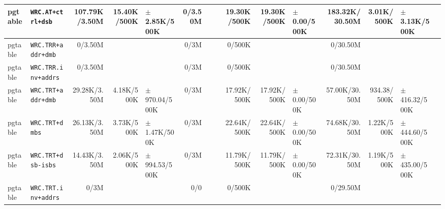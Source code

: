 \begin{tabular}{l l  | r r l | r r l | r r l | r r l l}
         pgtable &                                     \verb|WRC.AT+ctrl+dsb| &  107.79K/3.50M &           15.40K/500K &  $\pm$ 2.85K/500K &        0/3.50M &                       &                 &    19.30K/500K &           19.30K/500K &   $\pm$ 0.00/500K & 183.32K/30.50M &            3.01K/500K &  $\pm$ 3.13K/500K & \\ \hline 
         pgtable &                                    \verb|WRC.TRR+addr+dmb| &        0/3.50M &                       &                   &           0/3M &                       &                 &         0/500K &                       &                   &       0/30.50M &                       &                   & \\ \hline 
         pgtable &                                   \verb|WRC.TRR.inv+addrs| &        0/3.50M &                       &                   &           0/3M &                       &                 &         0/500K &                       &                   &       0/30.50M &                       &                   & \\ \hline 
         pgtable &                                    \verb|WRC.TRT+addr+dmb| &   29.28K/3.50M &            4.18K/500K & $\pm$ 970.04/500K &           0/3M &                       &                 &    17.92K/500K &           17.92K/500K &   $\pm$ 0.00/500K &  57.00K/30.50M &           934.38/500K & $\pm$ 416.32/500K & \\ \hline 
         pgtable &                                        \verb|WRC.TRT+dmbs| &   26.13K/3.50M &            3.73K/500K &  $\pm$ 1.47K/500K &           0/3M &                       &                 &    22.64K/500K &           22.64K/500K &   $\pm$ 0.00/500K &  74.68K/30.50M &            1.22K/500K & $\pm$ 444.60/500K & \\ \hline 
         pgtable &                                    \verb|WRC.TRT+dsb-isbs| &   14.43K/3.50M &            2.06K/500K & $\pm$ 994.53/500K &           0/3M &                       &                 &    11.79K/500K &           11.79K/500K &   $\pm$ 0.00/500K &  72.31K/30.50M &            1.19K/500K & $\pm$ 435.00/500K & \\ \hline 
         pgtable &                                   \verb|WRC.TRT.inv+addrs| &           0/3M &                       &                   &            0/0 &                       &                 &         0/500K &                       &                   &       0/29.50M &                       &                   & \\ \hline 

\end{tabular}
